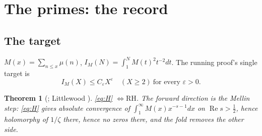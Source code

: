 \documentclass[11pt]{article}
\newtheorem{theorem}{Theorem}[section]
\theoremstyle{definition}
\theoremstyle{remark}
\newcommand{\Ree}{\operatorname{Re}}
\begin{document}
\section{The primes: the record}\label{sec:primes}

\subsection{The target}
$M(x)=\sum_{n\le x}\mu(n)$, $I_M(N)=\int_1^NM(t)^2t^{-2}dt$. The running proof's single target is
\begin{equation}\tag{H}\label{eq:H}
I_M(X)\le C_\varepsilon X^\varepsilon\quad(X\ge2)\ \text{for every }\varepsilon>0 .
\end{equation}
\begin{theorem}[{\cite[\S11]{summary}}; Littlewood {\cite[\S14.25]{titchmarsh}}]\label{thm:closing}
\eqref{eq:H} $\iff\mathrm{RH}$. The forward direction is the Mellin step: \eqref{eq:H} gives absolute convergence of $\int_1^\infty M(x)x^{-s-1}dx$ on $\Ree s>\tfrac12$, hence holomorphy of $1/\zeta$ there, hence no zeros there, and the fold removes the other side.
\end{theorem}
\end{document}
